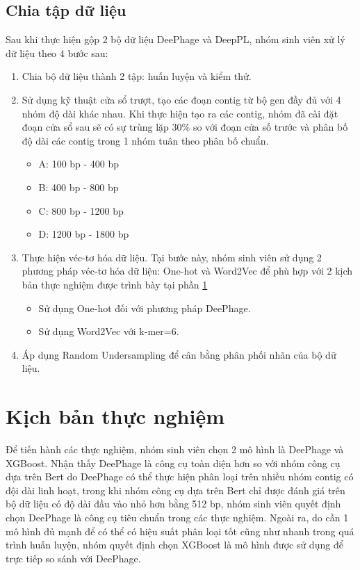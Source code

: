 \subsection{ Chia tập dữ liệu}
Sau khi thực hiện gộp 2 bộ dữ liệu DeePhage và DeepPL, nhóm sinh viên xử lý dữ liệu theo 4 bước sau:
\begin{enumerate}
    \item Chia bộ dữ liệu thành 2 tập: huấn luyện và kiểm thử.
    \item Sử dụng kỹ thuật cửa sổ trượt, tạo các đoạn contig từ bộ gen đầy đủ với 4 nhóm độ dài khác nhau. Khi thực hiện tạo ra các contig, nhóm đã cài đặt đoạn cửa sổ sau sẽ có sự trùng lặp 30\% so với đoạn cửa số trước và phân bố độ dài các contig trong 1 nhóm tuân theo phân bố chuẩn.
    \begin{itemize}
        \item A: 100 bp - 400 bp
        \item B: 400 bp - 800 bp
        \item C: 800 bp - 1200 bp
        \item D: 1200 bp - 1800 bp
    \end{itemize}
    \item Thực hiện véc-tơ hóa dữ liệu. Tại bước này, nhóm sinh viên sử dụng 2 phương pháp véc-tơ hóa dữ liệu: One-hot và Word2Vec để phù hợp với 2 kịch bản thực nghiệm được trình bày tại phần \ref{ kịch bản thực nghiệm}
    \begin{itemize}
        \item Sử dụng One-hot đối với phương pháp DeePhage.
        \item Sử dụng Word2Vec với k-mer=6.
    \end{itemize}
    \item Áp dụng Random Undersampling để cân bằng phân phối nhãn của bộ dữ liệu.
\end{enumerate}

\section{Kịch bản thực nghiệm}\label{ kịch bản thực nghiệm}
Để tiến hành các thực nghiệm, nhóm sinh viên chọn 2 mô hình là DeePhage và XGBoost. Nhận thấy DeePhage là công cụ toàn diện hơn so với nhóm công cụ dựa trên Bert do DeePhage có thể thực hiện phân loại trên nhiều nhóm contig có đội dài linh hoạt, trong khi nhóm công cụ dựa trên Bert chỉ được đánh giá trên bộ dữ liệu có độ dài đầu vào nhỏ hơn bằng 512 bp, nhóm sinh viên quyết định chọn DeePhage là công cụ tiêu chuẩn trong các thực nghiệm. Ngoài ra, do cần 1 mô hình đủ mạnh để có thể có hiệu suất phân loại tốt cũng như nhanh trong quá trình huấn luyện, nhóm quyết định chọn XGBoost là mô hình được sử dụng để trực tiếp so sánh với DeePhage.

